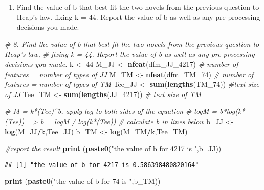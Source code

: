 \documentclass[]{article}
\newenvironment{Shaded}{\begin{snugshade}}{\end{snugshade}}
\newcommand{\KeywordTok}[1]{\textcolor[rgb]{0.13,0.29,0.53}{\textbf{#1}}}
\newcommand{\DecValTok}[1]{\textcolor[rgb]{0.00,0.00,0.81}{#1}}
\newcommand{\StringTok}[1]{\textcolor[rgb]{0.31,0.60,0.02}{#1}}
\newcommand{\CommentTok}[1]{\textcolor[rgb]{0.56,0.35,0.01}{\textit{#1}}}
\newcommand{\OperatorTok}[1]{\textcolor[rgb]{0.81,0.36,0.00}{\textbf{#1}}}
\newcommand{\NormalTok}[1]{#1}
\providecommand{\tightlist}{%
  \setlength{\itemsep}{0pt}\setlength{\parskip}{0pt}}
\begin{document}
\begin{enumerate}
\def\labelenumi{\arabic{enumi}.}
\setcounter{enumi}{7}
\tightlist
\item
  Find the value of b that best fit the two novels from the previous
  question to Heap's law, fixing k = 44. Report the value of b as well
  as any pre-processing decisions you made.
\end{enumerate}

\begin{Shaded}
\begin{Highlighting}[]
\CommentTok{# 8. Find the value of b that best fit the two novels from the previous question to Heap’s law, }
\CommentTok{# fixing k = 44. Report the value of b as well as any pre-processing decisions you made.}
\NormalTok{k <-}\StringTok{ }\DecValTok{44}
\NormalTok{M_JJ <-}\StringTok{ }\KeywordTok{nfeat}\NormalTok{(dfm_JJ_}\DecValTok{4217}\NormalTok{) }\CommentTok{# number of features = number of types of JJ}
\NormalTok{M_TM <-}\StringTok{ }\KeywordTok{nfeat}\NormalTok{(dfm_TM_}\DecValTok{74}\NormalTok{) }\CommentTok{# number of features = number of types of TM}
\NormalTok{Tee_JJ <-}\StringTok{ }\KeywordTok{sum}\NormalTok{(}\KeywordTok{lengths}\NormalTok{(TM_}\DecValTok{74}\NormalTok{)) }\CommentTok{#text size of JJ}
\NormalTok{Tee_TM <-}\StringTok{ }\KeywordTok{sum}\NormalTok{(}\KeywordTok{lengths}\NormalTok{(JJ_}\DecValTok{4217}\NormalTok{)) }\CommentTok{# text size of TM}

\CommentTok{# M = k*(Tee)^b, apply log to both sides of the equation}
\CommentTok{# logM = b*log(k*(Tee)) => b = logM / log(k*(Tee))}
\CommentTok{# calculate b in lines below}
\NormalTok{b_JJ <-}\StringTok{ }\KeywordTok{log}\NormalTok{(M_JJ}\OperatorTok{/}\NormalTok{k,Tee_JJ)}
\NormalTok{b_TM <-}\StringTok{ }\KeywordTok{log}\NormalTok{(M_TM}\OperatorTok{/}\NormalTok{k,Tee_TM)}

\CommentTok{#report the result}
\KeywordTok{print}\NormalTok{ (}\KeywordTok{paste0}\NormalTok{(}\StringTok{"the value of b for 4217 is "}\NormalTok{,b_JJ))}
\end{Highlighting}
\end{Shaded}

\begin{verbatim}
## [1] "the value of b for 4217 is 0.586398480820164"
\end{verbatim}

\begin{Shaded}
\begin{Highlighting}[]
\KeywordTok{print}\NormalTok{ (}\KeywordTok{paste0}\NormalTok{(}\StringTok{"the value of b for 74 is "}\NormalTok{,b_TM))}
\end{Highlighting}
\end{Shaded}
\end{document}
